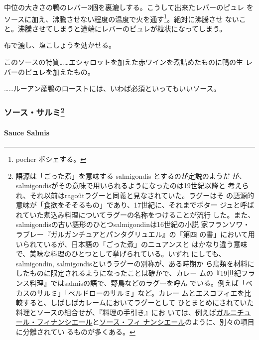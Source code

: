 \begin{recette}
中位の大きさの鴨のレバー3個を裏漉しする。こうして出来たレバーのピュレ
をソースに加え、沸騰させない程度の温度で火を通す\footnote{pocher
  ポシェする。}。絶対に沸騰させ
ないこと。沸騰させてしまうと途端にレバーのピュレが粒状になってしまう。

布で漉し、塩こしょうを効かせる。

このソースの特質\ldots{}\ldots{}エシャロットを加えた赤ワインを煮詰めたものに鴨の生
レバーのピュレを加えたもの。

\ldots{}\ldots{}ルーアン産鴨のローストには、いわば必須といってもいいソース。

\maeaki

\hypertarget{ux30bdux30fcux30b9ux30b5ux30ebux30df92}{%
\subsubsection[ソース・サルミ]{\texorpdfstring{ソース・サルミ\footnote{語源は「ごった煮」を意味する
  salmigondis とするのが定説のようだ
  が、salmigondisがその意味で用いられるようになったのは19世紀以降と
  考えられ、それ以前はragoûtラグーと同義と見なされていた。ラグーはそ
  の語源的意味が「食欲をそそるもの」であり、17世紀に、それまでポター
  ジュと呼ばれていた煮込み料理についてラグーの名称をつけることが流行
  した。また、salmigondisの古い語形のひとつsalmigondinは16世紀の小説
  家フランソワ・ラブレー『ガルガンチュアとパンタグリュエル』の「第四
  の書」において用いられているが、日本語の「ごった煮」のニュアンスと
  はかなり違う意味で、美味な料理のひとつとして挙げられている。いずれ
  にしても、salmigondin, salmigondisというラグーの別称が、ある時期か
  ら鳥類を材料にしたものに限定されるようになったことは確かで、カレー
  ムの『19世紀フランス料理』ではsalmisの語で、野鳥などのラグーを呼ん
  でいる。例えば「ベカスのサルミ」「ペルドローのサルミ」など。カレー
  ムとエスコフィエを比較すると、しばしばカレームにおいてラグーとして
  ひとまとめにされていた料理とソースの組合せが、『料理の手引き』にお
  いては、例えば\protect\hyperlink{}{ガルニチュール・フィナンシエール}と\protect\hyperlink{sauce-financiere}{ソース・フィ
  ナンシエール}のように、別々の項目に分離されてい るものが多くある。}}{ソース・サルミ}}\label{ux30bdux30fcux30b9ux30b5ux30ebux30df92}}

\hypertarget{sauce-salmis}{%
\paragraph{Sauce Salmis}\label{sauce-salmis}}

  


\end{recette}
